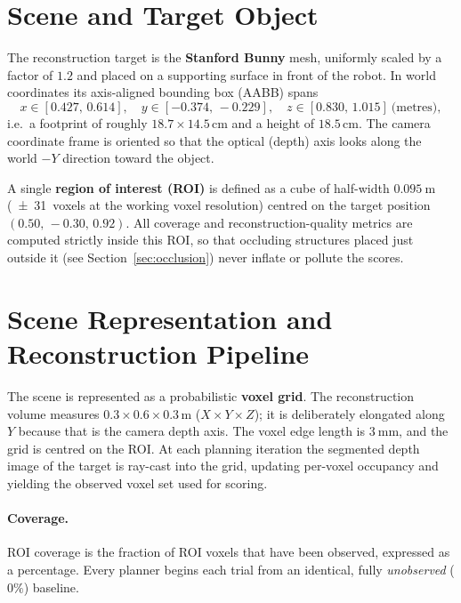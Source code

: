 \section{Scene and Target Object}
\label{sec:scene}

The reconstruction target is the \textbf{Stanford Bunny} mesh, uniformly
scaled by a factor of $1.2$ and placed on a supporting surface in front of
the robot. In world coordinates its axis-aligned bounding box (AABB) spans
\[
  x\in[0.427,\,0.614],\quad
  y\in[-0.374,\,-0.229],\quad
  z\in[0.830,\,1.015]\ \text{(metres)},
\]
i.e.\ a footprint of roughly $18.7\times14.5$\,cm and a height of $18.5$\,cm.
The camera coordinate frame is oriented so that the optical (depth) axis
looks along the world $-Y$ direction toward the object.

A single \textbf{region of interest (ROI)} is defined as a cube of
half-width $\SI{0.095}{\meter}$ (\SI{\pm31}{voxels} at the working voxel
resolution) centred on the target position $(0.50,\,-0.30,\,0.92)$. All
coverage and reconstruction-quality metrics are computed strictly inside
this ROI, so that occluding structures placed just outside it (see
Section~\ref{sec:occlusion}) never inflate or pollute the scores.

\section{Scene Representation and Reconstruction Pipeline}
\label{sec:representation}

The scene is represented as a probabilistic \textbf{voxel grid}. The
reconstruction volume measures $0.3\times0.6\times0.3$\,m
($X\times Y\times Z$); it is deliberately elongated along $Y$ because that is
the camera depth axis. The voxel edge length is $\SI{3}{\milli\meter}$, and
the grid is centred on the ROI. At each planning iteration the segmented
depth image of the target is ray-cast into the grid, updating per-voxel
occupancy and yielding the observed voxel set used for scoring.

\paragraph{Coverage.}
ROI coverage is the fraction of ROI voxels that have been observed,
expressed as a percentage. Every planner begins each trial from an
identical, fully \emph{unobserved} ($0\%$) baseline.

